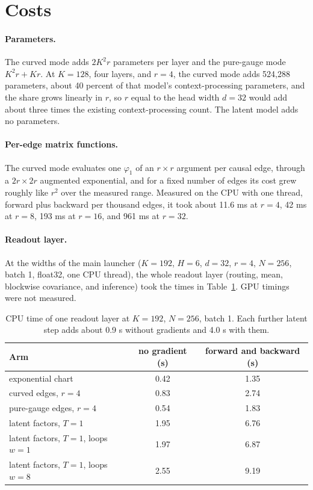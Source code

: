 \documentclass[11pt]{article}
\theoremstyle{definition}
\theoremstyle{remark}
\begin{document}
\section{Costs}
\label{sec:costs}

\paragraph{Parameters.}
The curved mode adds $2K^2r$ parameters per layer and the pure-gauge mode $K^2r+Kr$. At $K=128$, four layers, and $r=4$, the curved mode adds 524,288 parameters, about 40 percent of that model's context-processing parameters, and the share grows linearly in $r$, so $r$ equal to the head width $d=32$ would add about three times the existing context-processing count. The latent model adds no parameters.

\paragraph{Per-edge matrix functions.}
The curved mode evaluates one $\varphi_1$ of an $r\times r$ argument per causal edge, through a $2r\times2r$ augmented exponential, and for a fixed number of edges its cost grew roughly like $r^2$ over the measured range. Measured on the CPU with one thread, forward plus backward per thousand edges, it took about 11.6 ms at $r=4$, 42 ms at $r=8$, 193 ms at $r=16$, and 961 ms at $r=32$.

\paragraph{Readout layer.}
At the widths of the main launcher ($K=192$, $H=6$, $d=32$, $r=4$, $N=256$, batch 1, float32, one CPU thread), the whole readout layer (routing, mean, blockwise covariance, and inference) took the times in Table~\ref{tab:timing}. GPU timings were not measured.

\begin{table}[tbp]
\centering
\small
\begin{tabular}{@{}lcc@{}}
\toprule
Arm & no gradient (s) & forward and backward (s) \\
\midrule
exponential chart & 0.42 & 1.35 \\
curved edges, $r=4$ & 0.83 & 2.74 \\
pure-gauge edges, $r=4$ & 0.54 & 1.83 \\
latent factors, $T=1$ & 1.95 & 6.76 \\
latent factors, $T=1$, loops $w=1$ & 1.97 & 6.87 \\
latent factors, $T=1$, loops $w=8$ & 2.55 & 9.19 \\
\bottomrule
\end{tabular}
\caption{CPU time of one readout layer at $K=192$, $N=256$, batch 1. Each further latent step adds about 0.9 s without gradients and 4.0 s with them.}
\label{tab:timing}
\end{table}
\end{document}
